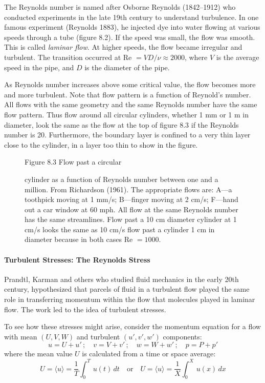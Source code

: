 The Reynolds number is named after Osborne Reynolds (1842--1912) who conducted
experiments in the late 19th century to understand turbulence.
In one famous experiment (Reynolds 1883), he injected dye into water flowing at various speeds
through a tube (figure 8.2). If the speed was small, the flow was smooth. This is
called
\textit{laminar flow}. At higher speeds, the flow became irregular and
turbulent. The transition occurred at Re $ = VD/\nu \approx 2000$, where $V$ is
the average speed in the pipe, and $D$ is the diameter of the pipe.

As Reynolds number increases above some critical value, the flow becomes more and
more turbulent. Note that flow pattern is a function of Reynold's number. All
flows with the same geometry and the same Reynolds number have the same flow
pattern. Thus flow around all circular cylinders, whether 1 mm or 1 m in
diameter, look the same as the flow at the top of figure 8.3 if the Reynolds
number is 20. Furthermore, the boundary layer is confined to a very thin layer
close to the cylinder, in a layer too thin to show in the figure.

\begin{figure}[t!]
\footnotesize
Figure 8.3 Flow past a circular \rule{0mm}{3ex}cylinder
as a function of Reynolds number between one and a million. From Richardson
(1961). The appropriate flows are: A---a toothpick moving at 1 mm/s; B---finger
moving at 2 cm/s; F---hand out a car window at 60 mph. All flow at the same
Reynolds number has the same streamlines. Flow past a 10 cm diameter cylinder at
1 cm/s looks the same as 10 cm/s flow past a cylinder 1 cm in diameter because in
both cases Re $= 1000$.
\label{fig:turbsketch}
\vspace{-2ex}
\end{figure}

\paragraph{Turbulent Stresses: The Reynolds Stress}
Prandtl, Karman and others who
studied fluid mechanics in the early 20th century, hypothesized that parcels of
fluid in a turbulent flow played the same role in transferring momentum within the
flow that molecules played in laminar flow. The work led to the idea of turbulent
stresses.

To see how these stresses might arise, consider the momentum equation for a flow
with mean $(U, V, W)$ and turbulent $(u', v', w')$ components:
\begin{equation}
u=U+u' \,;\quad v = V+v' \,;\quad w=W+w' \, ;\quad p=P+p'
\end{equation}
where the mean value $U$ is calculated from a time or space average:
\begin{equation}
U = \langle u \rangle =\frac{1}{T}\int^T_0\,u(t)\,dt \quad \text{or}\quad
U = \langle u \rangle =\frac{1}{X}\int^X_0\,u(x)\,dx
\end{equation}

